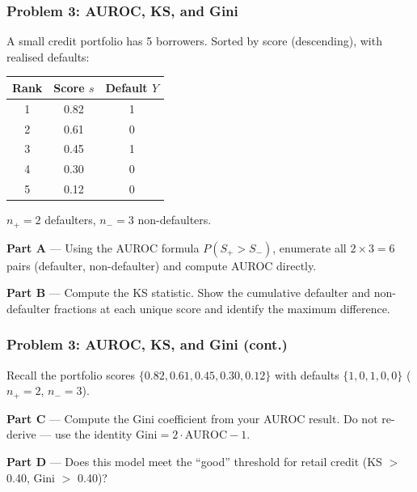\documentclass[9pt,t]{beamer}
\begin{document}
\begin{frame}
\frametitle{Problem 3: AUROC, KS, and Gini}

A small credit portfolio has 5 borrowers. Sorted by score (descending), with realised defaults:

\begin{center}
\begin{tabular}{ccc}
\toprule
Rank & Score $s$ & Default $Y$ \\
\midrule
1 & 0.82 & 1 \\
2 & 0.61 & 0 \\
3 & 0.45 & 1 \\
4 & 0.30 & 0 \\
5 & 0.12 & 0 \\
\bottomrule
\end{tabular}
\end{center}

$n_+ = 2$ defaulters, $n_- = 3$ non-defaulters.

\medskip
\textbf{Part A} --- Using the AUROC formula $P(S_+ > S_-)$, enumerate all $2 \times 3 = 6$ pairs (defaulter, non-defaulter) and compute AUROC directly.

\medskip
\textbf{Part B} --- Compute the KS statistic. Show the cumulative defaulter and non-defaulter fractions at each unique score and identify the maximum difference.
\end{frame}

\begin{frame}
\frametitle{Problem 3: AUROC, KS, and Gini (cont.)}

Recall the portfolio scores $\{0.82, 0.61, 0.45, 0.30, 0.12\}$ with defaults
$\{1, 0, 1, 0, 0\}$ ($n_+ = 2$, $n_- = 3$).

\medskip
\textbf{Part C} --- Compute the Gini coefficient from your AUROC result. Do not re-derive --- use the identity $\text{Gini} = 2 \cdot \text{AUROC} - 1$.

\medskip
\textbf{Part D} --- Does this model meet the ``good'' threshold for retail credit (KS $>$ 0.40, Gini $>$ 0.40)?
\end{frame}
\end{document}
